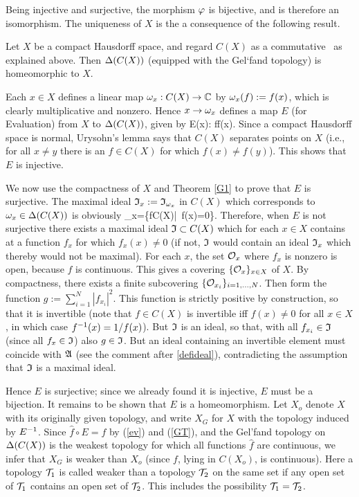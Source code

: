 Being injective and surjective, the morphism $\varphi$ is bijective, and
is therefore an isomorphism. The uniqueness of $X$ is the a
consequence of the following result.
\begin{Proposition}
Let $X$ be a compact Hausdorff space, and regard $C(X)$ as a
commutative \ca\ as explained above. Then $\Delta(C(X))$ (equipped with
the Gel`fand topology) is homeomorphic to $X$. \end{Proposition}

Each $x\in X$ defines a linear map $\omega_x:C(X)\rightarrow {\Bbb C}$ by
$\omega_x(f):=f(x)$, which is clearly multiplicative and nonzero.  Hence
$x\rightarrow\omega_x$ defines a map $E$ (for Evaluation) from $X$ to
$\Delta(C(X))$, given by \be E(x): f\raw f(x).  \ee Since a
compact Hausdorff space is normal, Urysohn's lemma says that $C(X)$
separates points on $X$ (i.e., for all $x\neq y$ there is an $f\in
C(X)$ for which $f(x)\neq f(y)$). This shows that $E$ is injective.

We now use the compactness of $X$ and Theorem \ref{G1} to prove that
$E$ is surjective. The maximal ideal ${\frak I}_x:={\frak I}_{\omega_x}$ in $C(X)$
which corresponds to $\omega_x\in \Delta(C(X))$ is obviously \be
\GI_x=\{f\in C(X)|\, f(x)=0\}.  \ee Therefore, when $E$ is not
surjective there exists a maximal ideal ${\frak I}\subset C(X)$ which for
each $x\in X$ contains at a function $f_x$ for which $f_x(x)\neq 0$
(if not, ${\frak I}$ would contain an ideal ${\frak I}_x$ which thereby would not
be maximal). For each $x$, the set ${\cal O}_x$ where $f_x$ is nonzero is
open, because $f$ is continuous. This gives a covering
$\{{\cal O}_x\}_{x\in X}$ of $X$. By compactness, there exists a finite
subcovering $\{{\cal O}_{x_i}\}_{i=1,\ldots, N}$. Then form the function
$g:=\sum_{i=1}^N |f_{x_i}|^2$. This function is strictly positive by
construction, so that it is invertible (note that $f\in C(X)$ is
invertible iff $f(x)\neq 0$ for all $x\in X$, in which case
$f^{-1}(x)=1/f(x)$).  But ${\frak I}$ is an ideal, so that, with all
$f_{x_i}\in{\frak I}$ (since all $f_x\in{\frak I}$) also $g\in{\frak I}$. But an ideal
containing an invertible element must coincide with ${\frak A}$ (see the
comment after \ref{defideal}), contradicting the assumption that ${\frak I}$
is a maximal ideal.

Hence $E$ is surjective; since we already found it is injective, $E$
must be a bijection. It remains to be shown that $E$ is a
homeomorphism.  Let $X_o$ denote $X$ with its originally given
topology, and write $X_G$ for $X$ with the topology induced by
$E^{-1}$.  Since $\hat{f}\circ E=f$ by (\ref{ev}) and (\ref{GT}), and
the Gel'fand topology on $\Delta(C(X))$ is the weakest topology for which
all functions $\hat{f}$ are continuous, we infer that $X_G$ is weaker
than $X_o$ (since $f$, lying in $C(X_o)$, is continuous).  Here a
topology ${\cal T}_1$ is called weaker than a topology ${\cal T}_2$ on the same
set if any open set of ${\cal T}_1$ contains an open set of ${\cal T}_2$.  This
includes the possibility ${\cal T}_1={\cal T}_2$.

